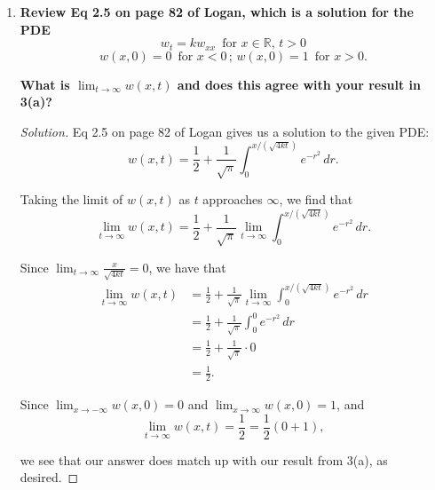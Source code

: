 \documentclass[11pt]{article}
\newenvironment{solution}
  {\renewcommand\qedsymbol{$\blacksquare$}\begin{proof}[Solution]}
  {\end{proof}}
\begin{document}
\begin{enumerate}
\begin{enumerate}
\begin{solution}
Factoring out the constants $a$ and $b$ and using the fact that $\int_{-\infty}^{0} e^{-r^2} \, dr = \int_{0}^{\infty} e^{-r^2} \, dr = \frac{\sqrt{\pi}}{2}$, we have that
\begin{align*} \lim_{t \rightarrow \infty} u(x, t) &= \frac{1}{\sqrt{\pi}} \left[\int_{-\infty}^{0} e^{-r^2} b \, dr + \int_{0}^{\infty} e^{-r^2} a  \, dr  \right] \\
&= \frac{1}{\sqrt{\pi}} \left[ b \int_{-\infty}^{0} e^{-r^2} \, dr + a \int_{0}^{\infty} e^{-r^2} \, dr \right] \\
&= \frac{1}{\sqrt{\pi}} \left[b \frac{\sqrt{\pi}}{2} + a \frac{\sqrt{\pi}}{2} \right] \\
&= \frac{1}{2} (a+b).
\end{align*}

Thus, we have that \[\boxed{\lim_{t\rightarrow \infty} u (x, t) = \frac{1}{2} (a+b)}.\]
\end{solution}




\item \textbf{Review Eq 2.5 on page 82 of Logan, which is a solution for the PDE}
\[ w_t = kw_{xx} \, \, \, \text{for } x \in \mathbb{R}, \, t > 0\]
\[ w(x, 0) = 0 \, \, \,\text{for } x < 0 \, ; \, w(x, 0) = 1 \, \, \, \text{for } x > 0.\]

\textbf{What is $\lim_{t \rightarrow \infty} w(x, t)$ and does this agree with your result in 3(a)?}

\begin{solution}
Eq 2.5 on page 82 of Logan gives us a solution to the given PDE:
\[ w(x, t) = \frac{1}{2} + \frac{1}{\sqrt{\pi}} \int_0^{x/(\sqrt{4kt})} e^{-r^2} \, dr.\]

Taking the limit of $w(x, t)$ as $t$ approaches $\infty$, we find that 
\[\lim_{t \rightarrow \infty} w(x, t) = \frac{1}{2} + \frac{1}{\sqrt{\pi}} \lim_{t \rightarrow \infty} \int_0^{x/(\sqrt{4kt})} e^{-r^2} \, dr.\]

Since $\lim_{t \rightarrow \infty} \frac{x}{\sqrt{4kt}} = 0$, we have that 
\begin{align*} \lim_{t \rightarrow \infty} w(x, t) &= \frac{1}{2} + \frac{1}{\sqrt{\pi}} \lim_{t \rightarrow \infty} \int_0^{x/(\sqrt{4kt})} e^{-r^2} \, dr \\
&= \frac{1}{2} + \frac{1}{\sqrt{\pi}} \int_0^0 e^{-r^2} \, dr \\
&= \frac{1}{2} + \frac{1}{\sqrt{\pi}} \cdot 0 \\ &= \frac{1}{2}.\end{align*}

Since $\lim_{x \rightarrow -\infty} w(x, 0) = 0$ and $\lim_{x \rightarrow \infty} w(x, 0) = 1$, and 
\[\lim_{t \rightarrow \infty} w(x, t)= \frac{1}{2} = \frac{1}{2} (0 + 1),\]

we see that our answer does match up with our result from 3(a), as desired.
\end{solution}
\end{enumerate}
\end{enumerate}
\end{document}
